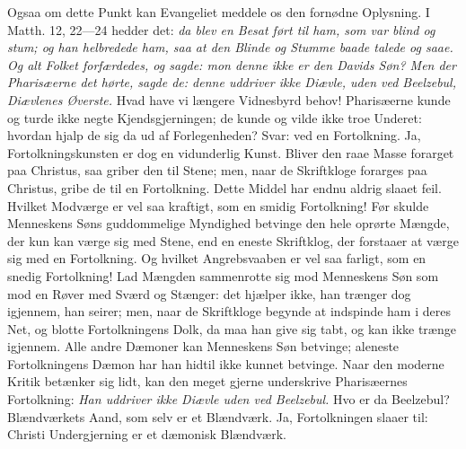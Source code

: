 \documentclass[12pt,a4paper]{book}
\begin{document}
Ogsaa om dette Punkt kan Evangeliet meddele os
den fornødne Oplysning. I Matth. 12, 22---24 hedder det: \emph{da blev en Besat ført
til ham, som var blind og stum; og han helbredede ham, saa at den Blinde og Stumme
baade talede og saae. Og alt Folket forfærdedes, og sagde: mon denne ikke er den Davids
Søn? Men der Pharisæerne det hørte, sagde de: denne uddriver ikke Diævle, uden ved
Beelzebul, Diævlenes Øverste.} Hvad have vi længere Vidnesbyrd behov! Pharisæerne kunde
og turde ikke negte Kjendsgjerningen; de kunde og vilde ikke troe Underet: hvordan
hjalp de sig da ud af Forlegenheden? Svar: ved en Fortolkning. Ja,
Fortolkningskunsten er dog en vidunderlig Kunst. Bliver den raae Masse forarget paa
Christus, saa griber den til Stene; men, naar de Skriftkloge forarges paa Christus,
gribe de til en Fortolkning. Dette Middel har endnu aldrig slaaet feil. Hvilket
Modværge er vel saa kraftigt, som en smidig Fortolkning! Før skulde Menneskens Søns
guddommelige Myndighed betvinge den hele oprørte Mængde, der kun kan værge sig med
Stene, end en eneste Skriftklog, der forstaaer at værge sig med en Fortolkning. Og
hvilket Angrebsvaaben er vel saa farligt, som en snedig Fortolkning! Lad
Mængden sammenrotte sig mod Menneskens Søn som mod en Røver med Sværd og Stænger: det
hjælper ikke, han trænger dog igjennem, han seirer; men, naar de Skriftkloge begynde at
indspinde ham i deres Net, og blotte Fortolkningens Dolk, da maa han give sig tabt, og
kan ikke trænge igjennem. Alle andre Dæmoner kan Menneskens Søn betvinge; aleneste
Fortolkningens Dæmon har han hidtil ikke kunnet betvinge. Naar den moderne Kritik
betænker sig lidt, kan den meget gjerne underskrive Pharisæernes Fortolkning: \emph{Han
uddriver ikke Diævle uden ved Beelzebul.} Hvo er da Beelzebul? Blændværkets Aand, som
selv er et Blændværk. Ja, Fortolkningen slaaer til: Christi Undergjerning er et
dæmonisk Blændværk.
\end{document}
